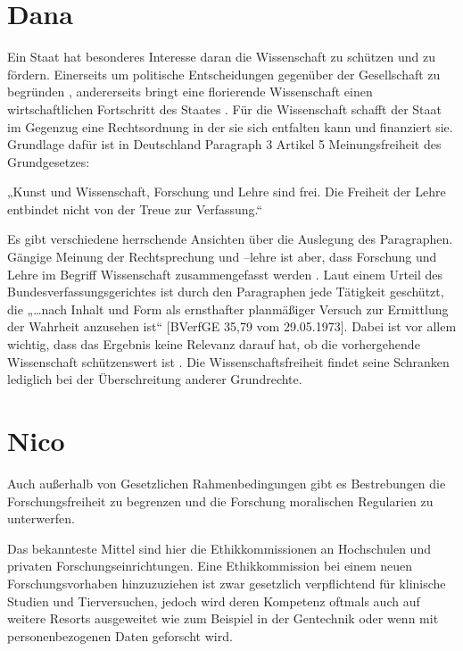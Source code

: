\documentclass{pmwk}
\begin{document}
\section*{Dana}
Ein Staat hat besonderes Interesse daran die Wissenschaft zu schützen und zu fördern. Einerseits um politische Entscheidungen gegenüber der Gesellschaft zu begründen \cite[11]{Huber}, andererseits bringt eine florierende Wissenschaft einen wirtschaftlichen Fortschritt des Staates \cite[35]{Huber}. Für die Wissenschaft schafft der Staat im Gegenzug eine Rechtsordnung in der sie sich entfalten kann und finanziert sie. Grundlage dafür ist in Deutschland Paragraph 3 Artikel 5 Meinungsfreiheit des Grundgesetzes:\par
„Kunst und Wissenschaft, Forschung und Lehre sind frei. Die Freiheit der Lehre entbindet nicht von der Treue zur Verfassung.“ \cite[Art 5 § 3]{gg}\par
Es gibt verschiedene herrschende Ansichten über die Auslegung des Paragraphen. Gängige Meinung der Rechtsprechung und –lehre ist aber, dass Forschung und Lehre im Begriff Wissenschaft zusammengefasst werden \cite[27]{RechFrei}. Laut einem Urteil des Bundesverfassungsgerichtes ist durch den Paragraphen jede Tätigkeit geschützt, die „…nach Inhalt und Form als ernsthafter planmäßiger Versuch zur Ermittlung der Wahrheit anzusehen ist“ [BVerfGE 35,79 vom 29.05.1973]. Dabei ist vor allem wichtig, dass das Ergebnis keine Relevanz darauf hat, ob die vorhergehende Wissenschaft schützenswert ist \cite[13]{WisArb}. Die Wissenschaftsfreiheit findet seine Schranken lediglich bei der Überschreitung anderer Grundrechte\cite[61]{Huber}.

\section*{Nico}
Auch außerhalb von Gesetzlichen Rahmenbedingungen gibt es Bestrebungen die Forschungsfreiheit zu begrenzen und die Forschung moralischen Regularien zu unterwerfen.\par

Das bekannteste Mittel sind hier die Ethikkommissionen an Hochschulen und privaten Forschungseinrichtungen. Eine Ethikkommission bei einem neuen Forschungsvorhaben hinzuzuziehen ist zwar gesetzlich verpflichtend für klinische Studien und Tierversuchen, jedoch wird deren Kompetenz oftmals auch auf weitere Resorts ausgeweitet wie zum Beispiel in der Gentechnik oder wenn mit personenbezogenen Daten geforscht wird.\par
\end{document}
